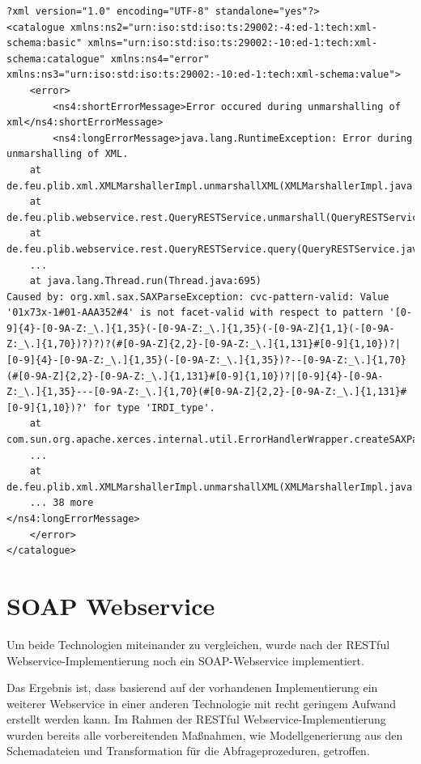  \begin{lstlisting}[caption=Fehlerbehandlung - Beispielantwort mit Validierungsfehler=xml, label=lst:error_catalogue_beispiel]
?xml version="1.0" encoding="UTF-8" standalone="yes"?>
<catalogue xmlns:ns2="urn:iso:std:iso:ts:29002:-4:ed-1:tech:xml-schema:basic" xmlns="urn:iso:std:iso:ts:29002:-10:ed-1:tech:xml-schema:catalogue" xmlns:ns4="error" xmlns:ns3="urn:iso:std:iso:ts:29002:-10:ed-1:tech:xml-schema:value">
    <error>
        <ns4:shortErrorMessage>Error occured during unmarshalling of xml</ns4:shortErrorMessage>
        <ns4:longErrorMessage>java.lang.RuntimeException: Error during unmarshalling of XML.
	at de.feu.plib.xml.XMLMarshallerImpl.unmarshallXML(XMLMarshallerImpl.java:63)
	at de.feu.plib.webservice.rest.QueryRESTService.unmarshall(QueryRESTService.java:151)
	at de.feu.plib.webservice.rest.QueryRESTService.query(QueryRESTService.java:91)
	...
	at java.lang.Thread.run(Thread.java:695)
Caused by: org.xml.sax.SAXParseException: cvc-pattern-valid: Value '01x73x-1#01-AAA352#4' is not facet-valid with respect to pattern '[0-9]{4}-[0-9A-Z:_\.]{1,35}(-[0-9A-Z:_\.]{1,35}(-[0-9A-Z]{1,1}(-[0-9A-Z:_\.]{1,70})?)?)?(#[0-9A-Z]{2,2}-[0-9A-Z:_\.]{1,131}#[0-9]{1,10})?|[0-9]{4}-[0-9A-Z:_\.]{1,35}(-[0-9A-Z:_\.]{1,35})?--[0-9A-Z:_\.]{1,70}(#[0-9A-Z]{2,2}-[0-9A-Z:_\.]{1,131}#[0-9]{1,10})?|[0-9]{4}-[0-9A-Z:_\.]{1,35}---[0-9A-Z:_\.]{1,70}(#[0-9A-Z]{2,2}-[0-9A-Z:_\.]{1,131}#[0-9]{1,10})?' for type 'IRDI_type'.
	at com.sun.org.apache.xerces.internal.util.ErrorHandlerWrapper.createSAXParseException(ErrorHandlerWrapper.java:195)
	...
	at de.feu.plib.xml.XMLMarshallerImpl.unmarshallXML(XMLMarshallerImpl.java:57)
	... 38 more
</ns4:longErrorMessage>
    </error>
</catalogue>
\end{lstlisting} 

\section{SOAP Webservice}

Um beide Technologien miteinander zu vergleichen, wurde nach der \gls{REST}ful \gls{Webservice}-Implementierung noch ein \gls{SOAP}-\gls{Webservice} implementiert. 

Das Ergebnis ist, dass basierend auf der vorhandenen Implementierung ein weiterer Webservice in einer anderen Technologie mit recht geringem Aufwand erstellt werden kann. Im Rahmen der \gls{REST}ful \gls{Webservice}-Implementierung wurden bereits alle vorbereitenden Maßnahmen, wie Modellgenerierung aus den Schemadateien und Transformation für die Abfrageprozeduren, getroffen. 
 
